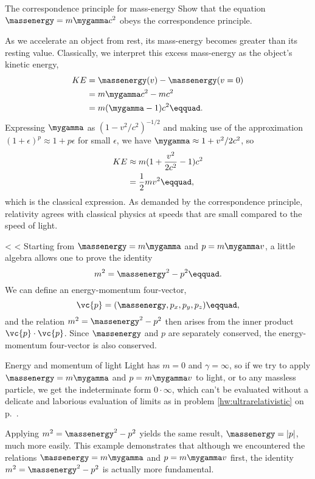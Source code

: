 \begin{eg}{The correspondence principle for mass-energy}
\egquestion Show that the equation $\massenergy=m\mygamma c^2$ obeys the correspondence principle.

\eganswer As we accelerate an object from rest, its mass-energy becomes greater than
its resting value. Classically, we interpret this excess mass-energy as the object's
kinetic energy,
\begin{align*}
  KE   &= \massenergy(v)-\massenergy(v=0) \\
       &= m\mygamma c^2 - m c^2 \\
       &= m(\mygamma-1)c^2\eqquad.
\end{align*}
Expressing $\mygamma$ as $\left(1-v^2/c^2\right)^{-1/2}$ and making use of the
approximation $(1+\epsilon)^p\approx 1+p\epsilon$ for small $\epsilon$, we have
$\mygamma\approx 1+v^2/2c^2$, so
\begin{align*}
  KE   &\approx m(1+\frac{v^2}{2c^2}-1)c^2 \\
       &= \frac{1}{2}mv^2\eqquad,
\end{align*}
which is the classical expression. As demanded by the correspondence principle,
relativity agrees with classical physics at speeds that are small compared to
the speed of light.
\end{eg}

<%
<%
Starting from $\massenergy=m\mygamma$ and $p=m\mygamma v$, a little algebra allows one to prove the identity
\begin{equation*}
  m^2 = \massenergy^2 - p^2\eqquad.
\end{equation*}
We can define an energy-momentum four-vector,
\begin{equation*}
  \vc{p} = (\massenergy,p_x,p_y,p_z)\eqquad,
\end{equation*}
and the relation $m^2 = \massenergy^2 - p^2$ then arises from the inner product $\vc{p}\cdot\vc{p}$.
Since $\massenergy$ and $p$ are separately conserved, the energy-momentum four-vector is also conserved.

\begin{eg}{Energy and momentum of light}\label{eg:light-p-from-four-vector}
Light has $m=0$ and $\gamma=\infty$, so if we try to apply $\massenergy=m\mygamma$ and $p=m\mygamma v$ to light,
or to any massless particle, we get the indeterminate form $0\cdot\infty$, which can't be evaluated without
a delicate and laborious evaluation of limits as in problem \ref{hw:ultrarelativistic}
on p.~\pageref{hw:ultrarelativistic}.

Applying $m^2 = \massenergy^2 - p^2$ yields the same result, $\massenergy=|p|$, much more easily. This example
demonstrates that although we encountered the relations $\massenergy=m\mygamma$ and $p=m\mygamma v$ first,
the identity $m^2 = \massenergy^2 - p^2$ is actually more fundamental.
\end{eg}

